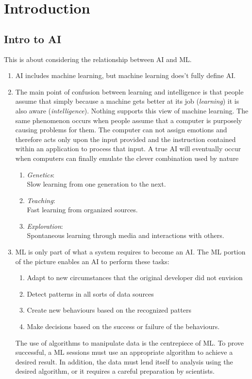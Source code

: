 \chapter{Introduction}
\section{Intro to AI}
This is about considering the relationship between AI and ML.
\begin{enumerate}
	\item AI includes machine learning, but machine learning does't fully define AI. 
	\item The main point of confusion between learning and intelligence is that people assume that simply because a machine gets better at its job (\emph{learning}) it is also aware (\emph{intelligence}). Nothing supports this view of machine learning. The same phenomenon occurs when people assume that a computer is purposely causing problems for them. The computer can not assign emotions and therefore acts only upon the input provided and the instruction contained within an application to process that input. A true AI will eventually occur when computers can finally emulate the clever combination used by nature
	\begin{enumerate}
		\item \emph{Genetics}:\\
		Slow learning from one generation to the next.
		\item \emph{Teaching}:\\
		Fast learning from organized sources.
		\item \emph{Exploration}:\\
		Spontaneous learning through media and interactions with others.
	\end{enumerate}
	\item ML is only part of what a system requires to become an AI. The ML portion of the picture enables an AI to perform these tasks:
	\begin{enumerate}
		\item Adapt to new circumstances that the original developer did not envision
		\item Detect patterns in all sorts of data sources
		\item Create new behaviours based on the recognized patters
		\item Make decisions based on the success or failure of the behaviours.
	\end{enumerate}
	The use of algorithms to manipulate data is the centrepiece of ML. To prove successful, a ML sessions must use an appropriate algorithm to achieve a desired result. In addition, the data must lend itself to analysis using the desired algorithm, or it requires a careful preparation by scientists. \\

\end{enumerate}
